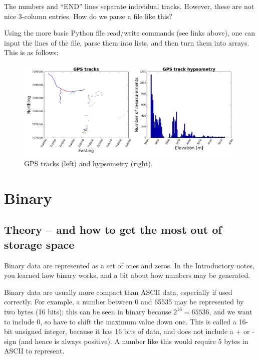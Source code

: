 \documentclass[a4paper,10pt]{scrartcl}
\begin{document}
The numbers and ``END'' lines separate individual tracks. However, these are not nice 3-column entries. How do we parse a file like this?

Using the more basic Python file read/write commands (see links above), one can input the lines of the file, parse them into lists, and then turn them into arrays. This is as follows:



\begin{figure}[!ht]
\begin{center}
\includegraphics[width=.9\linewidth]{figures/FilesData/GPStracks.png}
\end{center}
\caption{GPS tracks (left) and hypsometry (right).}
\end{figure}

\section{Binary}

\subsection{Theory -- and how to get the most out of storage space}

Binary data are represented as a set of ones and zeros. In the Introductory notes, you learned how binary works, and a bit about how numbers may be generated.

Binary data are usually more compact than ASCII data, especially if used correctly. For example, a number between 0 and 65535 may be represented by two bytes (16 bits); this can be seen in binary because $2^16 = 65536$, and we want to include 0, so have to shift the maximum value down one. This is called a 16-bit unsigned integer, because it has 16 bits of data, and does not include a + or - sign (and hence is always positive). A number like this would require 5 bytes in ASCII to represent.
\end{document}
